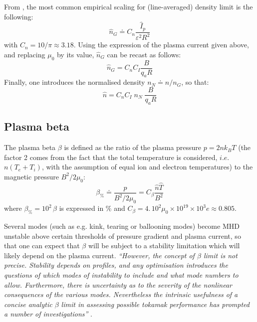 From \cite[eq.(14.146)]{Freidberg2007}, the most common empirical scaling for (line-averaged) density limit is the following:
\begin{equation}
\boxed{\hat n_G \doteq C_n \frac{\hat I_p}{\varepsilon^2 R^2}  }
\label{eqn:greenwald_density}
\end{equation}
with $C_n = 10/\pi \approx 3.18$.
Using the expression of the plasma current given above, and replacing $\mu_0$ by its value, $\hat n_G$ can be recast as follows:
\begin{equation}
\hat n_G = C_nC_I \frac{B}{q_aR}
\end{equation}
Finally, one introduces the normalised density $n_N\doteq n/ n_G$, so that:
\begin{equation}
  \hat n = C_nC_I\; n_N\; \frac{B}{q_aR}
  \label{eq:n_nN}
\end{equation}

\subsection{Plasma beta}
The plasma beta $\beta$ is defined as the ratio of the plasma pressure $p=2nk_BT$ (the factor 2 comes from the fact that the total temperature is considered, $i.e.$ $n(T_e+T_i)$, with the assumption of equal ion and electron temperatures) to the magnetic pressure $B^2/2\mu_0$:
\begin{equation}
\boxed{\beta_\% \doteq \frac{p}{B^2/2\mu_0}
 = C_\beta \frac{\hat n \hat T}{B^2}}
\label{eqn:beta}
\end{equation}
where $\beta_\%=10^2\, \beta$ is expressed in $\%$ and $C_\beta = 4.\,10^2\mu_0\times 10^{19}\times 10^3 e \approx 0.805$.

Several modes (such as e.g. kink, tearing or ballooning modes) become MHD unstable above certain thresholds of pressure gradient and plasma current, so that one can expect that $\beta$ will be subject to a stability limitation which will likely depend on the plasma current. \emph{``However, the concept of $\beta$ limit is not precise. Stability depends on profiles, and any optimisation introduces the questions of which modes of instability to include and what mode numbers to allow. Furthermore, there is uncertainty as to the severity of the nonlinear consequences of the various modes. Nevertheless the intrinsic usefulness of a concise analytic $\beta$ limit in assessing possible tokamak performance has prompted a number of investigations''} \cite{Wesson2004}.

